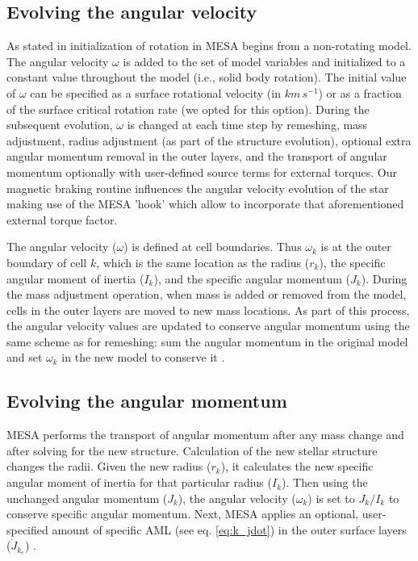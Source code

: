 \documentclass[fleqn,usenatbib]{mnras}
\begin{document}
\subsection{Evolving the angular velocity}
As stated in \citet{Paxton2015} initialization of rotation in MESA begins from a non-rotating model. The angular velocity $\omega$ is added to the set of model variables and initialized to a constant value throughout the model (i.e., solid body rotation). The initial value of $\omega$ can be specified as a surface rotational velocity (in $km\,s^{-1}$) or as a fraction of the surface critical rotation rate (we opted for this option). During the subsequent evolution, $\omega$ is changed at each time step by remeshing, mass adjustment, radius adjustment (as part of the structure evolution), optional extra angular momentum removal in the outer layers, and the transport of angular momentum optionally with user-defined source terms for external torques. Our magnetic braking routine influences the angular velocity evolution of the star making use of the MESA 'hook' which allow to incorporate that aforementioned external torque factor.\par

The angular velocity ($\omega$) is defined at cell boundaries. Thus $\omega_k$ is at the outer boundary of cell $k$, which is the same location as the radius ($r_k$), the specific angular moment of inertia ($I_k$), and the specific angular momentum ($J_k$). During the mass adjustment operation, when mass is added or removed from the model, cells in the outer layers are moved to new mass locations. As part of this process, the angular velocity values are updated to conserve angular momentum using the same scheme as for remeshing: sum the angular momentum in the original model and set $\omega_k$ in the new model to conserve it \citet{Paxton2015}.

\subsection{Evolving the angular momentum}
MESA performs the transport of angular momentum after any mass change and after solving for the new structure. Calculation of the new stellar structure changes the radii. Given the new radius ($r_k$), it calculates the new specific angular moment of inertia for that particular radius ($I_k$). Then using the unchanged angular momentum ($J_k$), the angular velocity ($\omega_k$) is set to $J_k/I_k$ to conserve specific angular momentum. Next, MESA applies an optional, user-specified amount of specific AML (see eq. \ref{eq:k_jdot}) in the outer surface layers ($\Dot{J}_{k_e}$) \citet{Paxton2015}.\par
\end{document}
